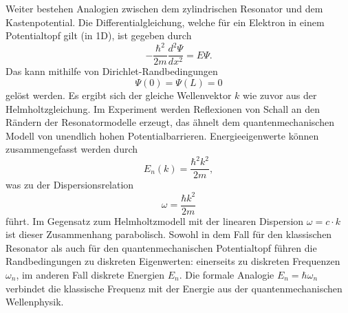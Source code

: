 \noindent Weiter bestehen Analogien zwischen dem zylindrischen Resonator und 
dem Kastenpotential. Die Differentialgleichung, welche für ein Elektron in einem 
Potentialtopf gilt (in 1D), ist gegeben durch 
\begin{equation*}
    -\frac{\hbar^2}{2m} \frac{d^2 \Psi}{dx^2} = E \Psi.
\end{equation*}
Das kann mithilfe von Dirichlet-Randbedingungen 
\begin{equation*}
    \Psi(0) = \Psi(L) = 0
\end{equation*}
gelöst werden. Es ergibt sich der gleiche Wellenvektor $k$ wie zuvor aus der 
Helmholtzgleichung. Im Experiment werden Reflexionen von Schall an den Rändern 
der Resonatormodelle erzeugt, das ähnelt dem quantenmechanischen Modell von 
unendlich hohen Potentialbarrieren. Energieeigenwerte können zusammengefasst 
werden durch 
\begin{equation*}
    E_n(k) = \frac{\hbar^2 k^2}{2m},
\end{equation*}
was zu der Dispersionsrelation
\begin{equation*}
    \omega = \frac{\hbar k^2}{2m}
\end{equation*}
führt. Im Gegensatz zum Helmholtzmodell mit der linearen Dispersion 
$\omega = c \cdot k$ ist dieser Zusammenhang parabolisch. Sowohl in dem Fall 
für den klassischen Resonator als auch für den quantenmechanischen Potentialtopf 
führen die Randbedingungen zu diskreten Eigenwerten: einerseits zu diskreten 
Frequenzen $\omega_n$, im anderen Fall diskrete Energien $E_n$. Die formale 
Analogie $E_n = \hbar \omega_n$ verbindet die klassische Frequenz mit der
Energie aus der quantenmechanischen Wellenphysik.

